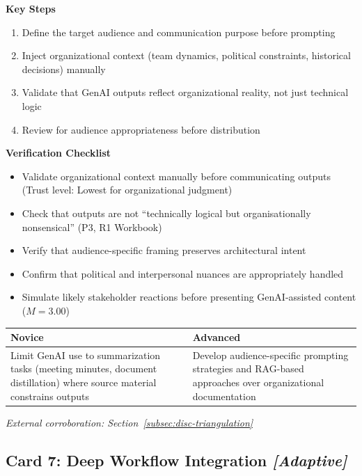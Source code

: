 \textbf{Key Steps}
\begin{enumerate}
    \item Define the target audience and communication purpose before prompting
    \item Inject organizational context (team dynamics, political constraints, historical decisions) manually
    \item Validate that GenAI outputs reflect organizational reality, not just technical logic
    \item Review for audience appropriateness before distribution
\end{enumerate}

\textbf{Verification Checklist}
\begin{itemize}[label=\checkbox]
    \item Validate organizational context manually before communicating outputs (Trust level: Lowest for organizational judgment)
    \item Check that outputs are not ``technically logical but organisationally nonsensical'' (P3, R1 Workbook)
    \item Verify that audience-specific framing preserves architectural intent
    \item Confirm that political and interpersonal nuances are appropriately handled
    \item Simulate likely stakeholder reactions before presenting GenAI-assisted content ($M = 3.00$)
\end{itemize}

\begin{tabular}{|p{6.5cm}|p{6.5cm}|}
    \hline
    \textbf{Novice} & \textbf{Advanced} \\
    \hline
    Limit GenAI use to summarization tasks (meeting minutes, document distillation) where source material constrains outputs & Develop audience-specific prompting strategies and RAG-based approaches over organizational documentation \\
    \hline
\end{tabular}

\vspace{0.5em}
\textit{External corroboration: Section~\ref{subsec:disc-triangulation}}

\clearpage
\subsection*{Card 7: Deep Workflow Integration \hfill \textit{[Adaptive]}}

